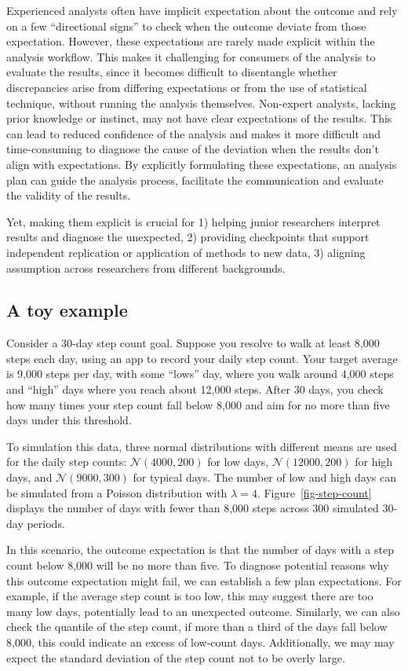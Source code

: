 \documentclass[
]{jds}
\begin{document}
Experienced analysts often have implicit expectation about the outcome
and rely on a few ``directional signs'' to check when the outcome
deviate from those expectation. However, these expectations are rarely
made explicit within the analysis workflow. This makes it challenging
for consumers of the analysis to evaluate the results, since it becomes
difficult to disentangle whether discrepancies arise from differing
expectations or from the use of statistical technique, without running
the analysis themselves. Non-expert analysts, lacking prior knowledge or
instinct, may not have clear expectations of the results. This can lead
to reduced confidence of the analysis and makes it more difficult and
time-consuming to diagnose the cause of the deviation when the results
don't align with expectations. By explicitly formulating these
expectations, an analysis plan can guide the analysis process,
facilitate the communication and evaluate the validity of the results.

Yet, making them explicit is crucial for 1) helping junior researchers
interpret results and diagnose the unexpected, 2) providing checkpoints
that support independent replication or application of methods to new
data, 3) aligning assumption across researchers from different
backgrounds.

\subsection{A toy example}\label{a-toy-example}

Consider a 30-day step count goal. Suppose you resolve to walk at least
8,000 steps each day, using an app to record your daily step count. Your
target average is 9,000 steps per day, with some ``lows'' day, where you
walk around 4,000 steps and ``high'' days where you reach about 12,000
steps. After 30 days, you check how many times your step count fall
below 8,000 and aim for no more than five days under this threshold.

To simulation this data, three normal distributions with different means
are used for the daily step counts: \(\mathcal{N}(4000, 200)\) for low
days, \(\mathcal{N}(12000, 200)\) for high days, and
\(\mathcal{N}(9000, 300)\) for typical days. The number of low and high
days can be simulated from a Poisson distribution with \(\lambda = 4\).
Figure~\ref{fig-step-count} displays the number of days with fewer than
8,000 steps across 300 simulated 30-day periods.

In this scenario, the outcome expectation is that the number of days
with a step count below 8,000 will be no more than five. To diagnose
potential reasons why this outcome expectation might fail, we can
establish a few plan expectations. For example, if the average step
count is too low, this may suggest there are too many low days,
potentially lead to an unexpected outcome. Similarly, we can also check
the quantile of the step count, if more than a third of the days fall
below 8,000, this could indicate an excess of low-count days.
Additionally, we may may expect the standard deviation of the step count
not to be overly large.
\end{document}
